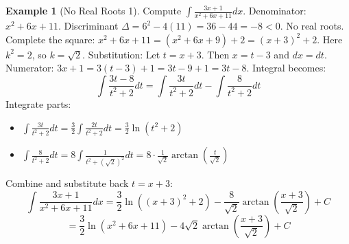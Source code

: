 \documentclass[11pt]{article}
\theoremstyle{plain}
\theoremstyle{definition}
\newtheorem{example}[theorem]{Example}
\theoremstyle{remark}
\begin{document}
\begin{example}[No Real Roots 1]
Compute $\int \frac{3x+1}{x^2+6x+11} dx$.
Denominator: $x^2+6x+11$. Discriminant $\Delta = 6^2 - 4(11) = 36-44 = -8 < 0$. No real roots.
Complete the square: $x^2+6x+11 = (x^2+6x+9) + 2 = (x+3)^2 + 2$. Here $k^2=2$, so $k=\sqrt{2}$.
Substitution: Let $t = x+3$. Then $x=t-3$ and $dx=dt$.
Numerator: $3x+1 = 3(t-3)+1 = 3t-9+1 = 3t-8$.
Integral becomes:
\[ \int \frac{3t-8}{t^2+2} dt = \int \frac{3t}{t^2+2} dt - \int \frac{8}{t^2+2} dt \]
Integrate parts:
\begin{itemize}
    \item $\int \frac{3t}{t^2+2} dt = \frac{3}{2} \int \frac{2t}{t^2+2} dt = \frac{3}{2} \ln(t^2+2)$
    \item $\int \frac{8}{t^2+2} dt = 8 \int \frac{1}{t^2+(\sqrt{2})^2} dt = 8 \cdot \frac{1}{\sqrt{2}} \arctan\left(\frac{t}{\sqrt{2}}\right)$
\end{itemize}
Combine and substitute back $t=x+3$:
\[ \int \frac{3x+1}{x^2+6x+11} dx = \frac{3}{2} \ln((x+3)^2+2) - \frac{8}{\sqrt{2}} \arctan\left(\frac{x+3}{\sqrt{2}}\right) + C \]
\[ = \frac{3}{2} \ln(x^2+6x+11) - 4\sqrt{2} \arctan\left(\frac{x+3}{\sqrt{2}}\right) + C \]
\end{example}
\end{document}
